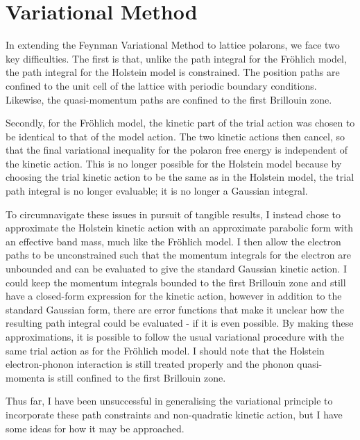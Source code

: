 \chapter{Variational Method}

In extending the Feynman Variational Method to lattice polarons, we face two key difficulties. The first is that, unlike the path integral for the Fr\"ohlich model, the path integral for the Holstein model is constrained. The position paths are confined to the unit cell of the lattice with periodic boundary conditions. Likewise, the quasi-momentum paths are confined to the first Brillouin zone. 
\newline

Secondly, for the Fr\"ohlich model, the kinetic part of the trial action was chosen to be identical to that of the model action. The two kinetic actions then cancel, so that the final variational inequality for the polaron free energy is independent of the kinetic action. This is no longer possible for the Holstein model because by choosing the trial kinetic action to be the same as in the Holstein model, the trial path integral is no longer evaluable; it is no longer a Gaussian integral.
\newline

To circumnavigate these issues in pursuit of tangible results, I instead chose to approximate the Holstein kinetic action with an approximate parabolic form with an effective band mass, much like the Fr\"ohlich model. I then allow the electron paths to be unconstrained such that the momentum integrals for the electron are unbounded and can be evaluated to give the standard Gaussian kinetic action. I could keep the momentum integrals bounded to the first Brillouin zone and still have a closed-form expression for the kinetic action, however in addition to the standard Gaussian form, there are error functions that make it unclear how the resulting path integral could be evaluated - if it is even possible. By making these approximations, it is possible to follow the usual variational procedure with the same trial action as for the Fr\"ohlich model. I should note that the Holstein electron-phonon interaction is still treated properly and the phonon quasi-momenta is still confined to the first Brillouin zone. 
\newline

Thus far, I have been unsuccessful in generalising the variational principle to incorporate these path constraints and non-quadratic kinetic action, but I have some ideas for how it may be approached.
\newline

